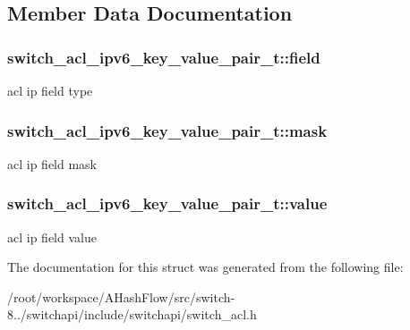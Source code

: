 \subsection{Member Data Documentation}
\hypertarget{structswitch__acl__ipv6__key__value__pair__t_a9fcce09d45f8da2dbd4845e0d522ebce}{
\subsubsection[{field}]{ switch\+\_\+acl\+\_\+ipv6\+\_\+key\+\_\+value\+\_\+pair\+\_\+t\+::field}}\label{structswitch__acl__ipv6__key__value__pair__t_a9fcce09d45f8da2dbd4845e0d522ebce}
acl ip field type \hypertarget{structswitch__acl__ipv6__key__value__pair__t_a7c777a118571f3fec2f9b683659faeb9}{
\subsubsection[{mask}]{ switch\+\_\+acl\+\_\+ipv6\+\_\+key\+\_\+value\+\_\+pair\+\_\+t\+::mask}}\label{structswitch__acl__ipv6__key__value__pair__t_a7c777a118571f3fec2f9b683659faeb9}
acl ip field mask \hypertarget{structswitch__acl__ipv6__key__value__pair__t_aa50e9398d181cc9c26b4ab38dfdec418}{
\subsubsection[{value}]{ switch\+\_\+acl\+\_\+ipv6\+\_\+key\+\_\+value\+\_\+pair\+\_\+t\+::value}}\label{structswitch__acl__ipv6__key__value__pair__t_aa50e9398d181cc9c26b4ab38dfdec418}
acl ip field value 

The documentation for this struct was generated from the following file\+:\begin{DoxyCompactItemize}
\item 
/root/workspace/\+A\+Hash\+Flow/src/switch-\/8../switchapi/include/switchapi/switch\+\_\+acl.\+h\end{DoxyCompactItemize}
